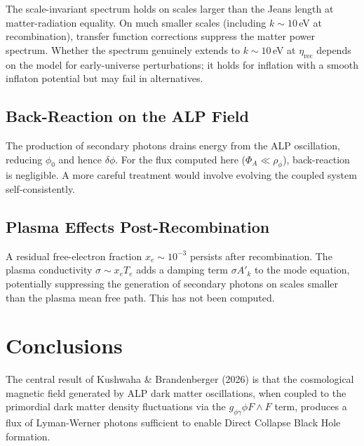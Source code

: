 \documentclass[12pt,a4paper]{report}
\newcommand{\gag}{g_{\phi\gamma}}
\newcommand{\phizero}{\phi_0}
\theoremstyle{definition}
\begin{document}
The scale-invariant spectrum holds on scales larger than the Jeans length at
matter-radiation equality. On much smaller scales (including $k\sim 10$\,eV at
recombination), transfer function corrections suppress the matter power spectrum.
Whether the spectrum genuinely extends to $k\sim 10$\,eV at $\eta_{\mathrm{rec}}$
depends on the model for early-universe perturbations; it holds for inflation with a
smooth inflaton potential but may fail in alternatives.

\section{Back-Reaction on the ALP Field}

The production of secondary photons drains energy from the ALP oscillation,
reducing $\phizero$ and hence $\delta\phi$. For the flux computed here
($\Phi_A\ll\rho_\phi$), back-reaction is negligible. A more careful treatment
would involve evolving the coupled system self-consistently.

\section{Plasma Effects Post-Recombination}

A residual free-electron fraction $x_e\sim 10^{-3}$ persists after recombination.
The plasma conductivity $\sigma\sim x_e T_e$ adds a damping term $\sigma A'_k$ to
the mode equation, potentially suppressing the generation of secondary photons on
scales smaller than the plasma mean free path. This has not been computed.

\chapter{Conclusions}

The central result of Kushwaha \& Brandenberger (2026) is that the cosmological
magnetic field generated by ALP dark matter oscillations, when coupled to the
primordial dark matter density fluctuations via the $\gag\phi F\wedge F$ term,
produces a flux of Lyman-Werner photons sufficient to enable Direct Collapse Black
Hole formation.
\end{document}
